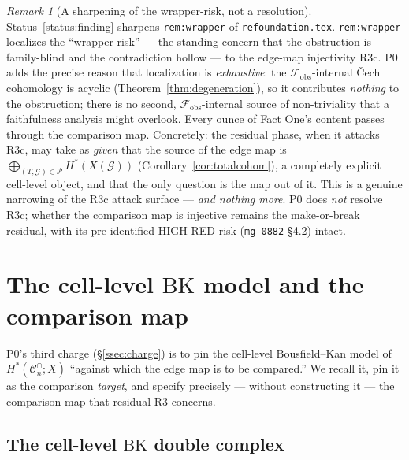 \documentclass[11pt,oneside]{amsart}
\theoremstyle{plain}
\theoremstyle{definition}
\theoremstyle{remark}
\newtheorem{remark}[theorem]{Remark}
\theoremstyle{honeststyle}
\newcommand{\G}{\mathcal{G}}
\newcommand{\Cn}{\mathcal{C}^{\cap}_n}
\newcommand{\BK}{\mathrm{BK}}
\newcommand{\fobs}{\mathcal{F}_{\mathrm{obs}}}
\newcommand{\Pp}{\mathcal{P}}
\begin{document}
\begin{remark}[A sharpening of the wrapper-risk, not a resolution]
\label{rem:wrapper-sharpened}
Status~\ref{status:finding} sharpens \texttt{rem:wrapper} of
\texttt{refoundation.tex}. \texttt{rem:wrapper} localizes the
``wrapper-risk'' --- the standing concern that the obstruction is
family-blind and the contradiction hollow --- to the edge-map
injectivity R3c. P0 adds the precise reason that localization is
\emph{exhaustive}: the $\fobs$-internal \v{C}ech cohomology is acyclic
(Theorem~\ref{thm:degeneration}), so it contributes \emph{nothing} to
the obstruction; there is no second, $\fobs$-internal source of
non-triviality that a faithfulness analysis might overlook. Every
ounce of Fact One's content passes through the comparison map.
Concretely: the residual phase, when it attacks R3c, may take as
\emph{given} that the source of the edge map is $\bigoplus_{(T,\G)\in
\Pp}H^{*}(X(\G))$ (Corollary~\ref{cor:totalcohom}), a completely
explicit cell-level object, and that the only question is the map out
of it. This is a genuine narrowing of the R3c attack surface ---
\emph{and nothing more}. P0 does \emph{not} resolve R3c; whether the
comparison map is injective remains the make-or-break residual, with
its pre-identified HIGH RED-risk (\texttt{mg-0882} \S4.2) intact.
\end{remark}

\section{The cell-level $\BK$ model and the comparison map}
\label{sec:bk}

P0's third charge (\S\ref{ssec:charge}) is to pin the cell-level
Bousfield--Kan model of $H^{*}(\Cn;X)$ ``against which the edge map is
to be compared.'' We recall it, pin it as the comparison \emph{target},
and specify precisely --- without constructing it --- the comparison
map that residual R3 concerns.

\subsection{The cell-level $\BK$ double complex}
\label{ssec:bkdouble}
\end{document}
